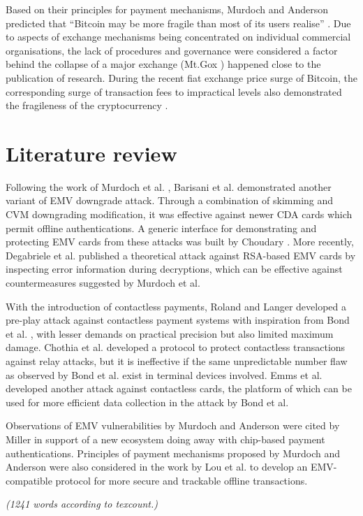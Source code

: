 \documentclass[11pt]{article}
\begin{document}
Based on their principles for payment mechanisms, Murdoch and Anderson predicted that ``Bitcoin may be more fragile than most of its users realise''  \cite[p. 11]{murdoch2014security}. Due to aspects of exchange mechanisms being concentrated on individual commercial organisations, the lack of procedures and governance were considered a factor behind the collapse of a major exchange (Mt.Gox \cite{mtgox}) happened close to the publication of research. During the recent fiat exchange price surge of Bitcoin, the corresponding surge of transaction fees to impractical levels also demonstrated the fragileness of the cryptocurrency \cite{btc}.

\section{Literature review}

Following the work of Murdoch et al. \cite{murdoch2010chip}, Barisani et al. \cite{barisani2011chip} demonstrated another variant of EMV downgrade attack. Through a combination of skimming and CVM downgrading modification, it was effective against newer CDA cards which permit offline authentications. A generic interface for demonstrating and protecting EMV cards from these attacks was built by Choudary \cite{choudary2012smart}. More recently, Degabriele et al. \cite{degabriele2012joint} published a theoretical attack against RSA-based EMV cards by inspecting error information during decryptions, which can be effective against countermeasures suggested by Murdoch et al.  

With the introduction of contactless payments, Roland and Langer \cite{roland2013cloning} developed a pre-play attack against contactless payment systems with inspiration from Bond et al. \cite{bond2014chip}, with lesser demands on practical precision but also limited maximum damage. Chothia et al. \cite{choudary2012smart} developed a protocol to protect contactless transactions against relay attacks, but it is ineffective if the same unpredictable number flaw as observed by Bond et al. exist in terminal devices involved. Emms et al. \cite{emms2014harvesting} developed another attack against contactless cards, the platform of which can be used for more efficient data collection in the attack by Bond et al.

Observations of EMV vulnerabilities by Murdoch and Anderson \cite{murdoch2014security} were cited by Miller \cite{miller2014defending} in support of a new ecosystem doing away with chip-based payment authentications. Principles of payment mechanisms proposed by Murdoch and Anderson were also considered in the work by Lou et al. \cite{luo2015emv} to develop an EMV-compatible protocol for more secure and trackable offline transactions.

\emph{(1241 words according to texcount.)}


\footnotesize{}
\end{document}

